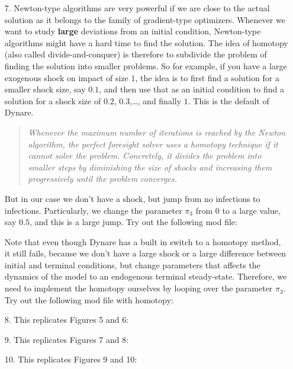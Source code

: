 \begin{itemize}
\item[7.] Newton-type algorithms are very powerful if we are close to the actual solution
  as it belongs to the family of gradient-type optimizers.
Whenever we want to study \textbf{large} deviations from an initial condition,
  Newton-type algorithms might have a hard time to find the solution.
The idea of homotopy (also called divide-and-conquer) is therefore to subdivide the problem of finding the solution into smaller problems.
So for example, if you have a large exogenous shock on impact of size \(1\),
  the idea is to first find a solution for a smaller shock size, say \(0.1\),
  and then use that as an initial condition to find a solution for a shock size of \(0.2\), \(0.3\),\ldots, and finally \(1\).
This is the default of Dynare.
\begin{quote}
\emph{Whenever the maximum number of iterations is reached by the Newton algorithm,
  the perfect foresight solver uses a homotopy technique if it cannot solve the problem.
Concretely, it divides the problem into smaller steps by diminishing the size of shocks
  and increasing them progressively until the problem converges.}
\end{quote}
But in our case we don't have a shock,
  but jump from no infections to infections.
Particularly, we change the parameter \(\pi_3\) from \(0\) to a large value, say \(0.5\),
  and this is a large jump.
Try out the following mod file:

Note that even though Dynare has a built in switch to a homotopy method,
  it still fails, because we don't have a large shock or a large difference between initial and terminal conditions,
  but change parameters that affects the dynamics of the model to an endogenous terminal steady-state.
Therefore, we need to implement the homotopy ourselves by looping over the parameter \(\pi_3\).
Try out the following mod file with homotopy:


\item[8.] This replicates Figures 5 and 6:


\item[9.] This replicates Figures 7 and 8:


\item[10.] This replicates Figures 9 and 10:


\end{itemize}
